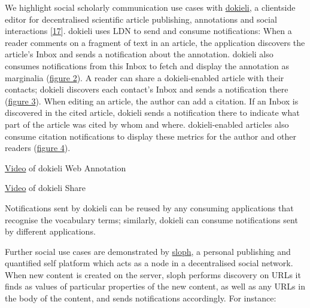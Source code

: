 \documentclass[]{article}
\begin{document}
We highlight social scholarly communication use cases with
\href{https://dokie.li/}{dokieli}, a clientside editor for decentralised
scientific article publishing, annotations and social interactions
{[}\protect\hyperlink{ref-17}{17}{]}. dokieli uses LDN to send and
consume notifications: When a reader comments on a fragment of text in
an article, the application discovers the article's Inbox and sends a
notification about the annotation. dokieli also consumes notifications
from this Inbox to fetch and display the annotation as marginalia
(\protect\hyperlink{figure-dokieli-annotation}{figure 2}). A reader can
share a dokieli-enabled article with their contacts; dokieli discovers
each contact's Inbox and sends a notification there
(\protect\hyperlink{figure-dokieli-share}{figure 3}). When editing an
article, the author can add a citation. If an Inbox is discovered in the
cited article, dokieli sends a notification there to indicate what part
of the article was cited by whom and where. dokieli-enabled articles
also consume citation notifications to display these metrics for the
author and other readers
(\protect\hyperlink{figure-dokieli-citation}{figure 4}).

\href{https://dokie.li/media/video/dokieli-annotation.webm}{Video} of
dokieli Web Annotation

\href{https://dokie.li/media/video/dokieli-share.webm}{Video} of dokieli
Share

Notifications sent by dokieli can be reused by any consuming
applications that recognise the vocabulary terms; similarly, dokieli can
consume notifications sent by different applications.

Further social use cases are demonstrated by
\href{https://rhiaro.co.uk/sloph}{sloph}, a personal publishing and
quantified self platform which acts as a node in a decentralised social
network. When new content is created on the server, sloph performs
discovery on URLs it finds as values of particular properties of the new
content, as well as any URLs in the body of the content, and sends
notifications accordingly. For instance:
\end{document}
